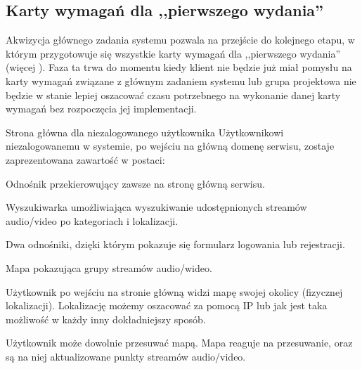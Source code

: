 \subsection{Karty wymagań dla ,,pierwszego wydania''}
\label{sec:EtapIswKWDPW}

Akwizycja głównego zadania systemu pozwala na przejście do kolejnego etapu, w którym przygotowuje się wszystkie karty wymagań dla ,,pierwszego wydania'' (więcej ). Faza ta trwa do momentu kiedy klient nie będzie już miał pomysłu na karty wymagań związane z głównym zadaniem systemu lub grupa projektowa nie będzie w stanie lepiej oszacować czasu potrzebnego na wykonanie danej karty wymagań bez rozpoczęcia jej implementacji.

\begin{userstory}{Strona główna dla niezalogowanego użytkownika}
    Użytkownikowi niezalogowanemu w systemie, po wejściu na główną domenę serwisu, zostaje zaprezentowana zawartość w postaci:
    \begin{packed_enum}
        \item Odnośnik przekierowujący zawsze na stronę główną serwisu.
        \item Wyszukiwarka umożliwiająca wyszukiwanie udostępnionych streamów audio/video po kategoriach i lokalizacji.
        \item Dwa odnośniki, dzięki którym pokazuje się formularz logowania lub rejestracji.
        \item Mapa pokazująca grupy streamów audio/wideo.
    \end{packed_enum}

    \begin{tests}
        \item{
            Użytkownik po wejściu na stronie główną widzi mapę swojej okolicy (fizycznej lokalizacji). Lokalizację możemy oszacować za pomocą IP lub jak jest taka możliwość w każdy inny dokładniejszy sposób.
        }
        \item{
            Użytkownik może dowolnie przesuwać mapą. Mapa reaguje na przesuwanie, oraz są na niej aktualizowane punkty streamów audio/video.
        }
    \end{tests}
\end{userstory}

